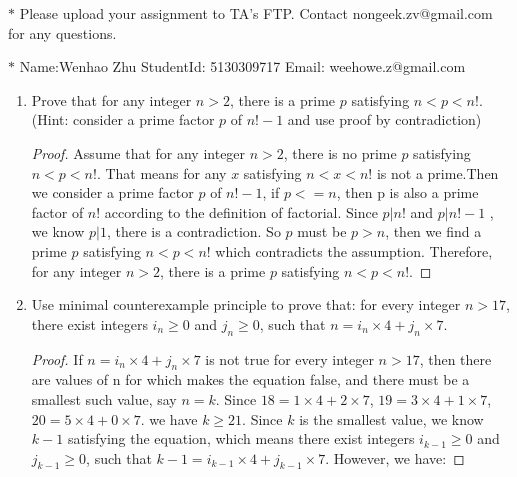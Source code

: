 \documentclass[12pt,a4paper]{article}
\theoremstyle{definition}
\numberwithin{equation}{section}
\numberwithin{figure}{section}
\begin{document}
\noindent

\noindent{}
\begin{center}
\footnotesize{\color{red}$*$ Please upload your assignment to TA's FTP. Contact nongeek.zv@gmail.com for any questions.}

\footnotesize{\color{blue}$*$ Name:Wenhao Zhu \quad StudentId: 5130309717 \quad Email: weehowe.z@gmail.com}
\end{center}

\begin{enumerate}

\item Prove that for any integer $n>2$, there is a prime $p$ satisfying $n<p<n!$. {\color{blue}(Hint: consider a prime factor $p$ of $n!-1$ and use proof by contradiction)}

\begin{proof} Assume that for any integer $n>2$, there is no prime $p$ satisfying $n<p<n!$. That means for any $x$ satisfying $n<x<n!$ is not a prime.Then we consider a prime factor $p$ of $n!-1$, if $p<=n$, then p is also a prime factor of $n!$ according to the definition of factorial. Since $p|n!$ and $p|n!-1$ , we know $p|1$, there is a contradiction. So $p$ must be $p>n$, then we find a prime $p$ satisfying $n<p<n!$ which contradicts the assumption. Therefore, for any integer $n>2$, there is a prime $p$ satisfying $n<p<n!$.
\end{proof}

\item Use minimal counterexample principle to prove that: for every integer $n>17$, there exist integers $i_n\ge 0$ and $j_n\ge 0$, such that $n = i_n \times 4 + j_n \times 7$.

\begin{proof} If $n = i_n \times 4 + j_n \times 7$ is not true for every integer $n>17$, then there are values of n for which makes the equation false, and there must be a smallest such value, say $n = k$. Since $18=1 \times 4 + 2 \times 7$, $19=3 \times 4 + 1 \times 7$, $20=5 \times 4 + 0 \times 7$. we have $k \ge 21$.  Since $k$ is the smallest value, we know $k-1$ satisfying the equation, which means there exist integers $i_{k-1}\ge 0$ and $j_{k-1}\ge 0$, such that $k-1 = i_{k-1} \times 4 + j_{k-1} \times 7$. However, we have:


\end{proof}
\end{enumerate}
\end{document}
